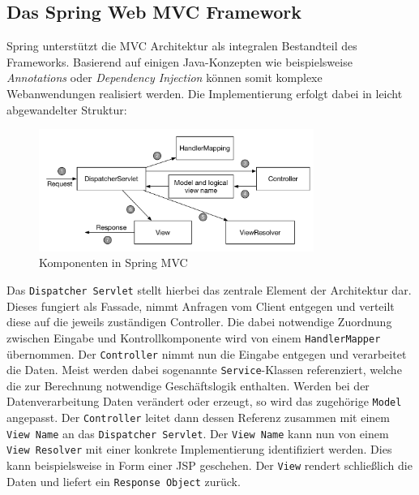 \subsection{Das Spring Web MVC Framework}
Spring unterstützt die \acs{MVC} Architektur als integralen Bestandteil des Frameworks. Basierend auf einigen Java-Konzepten wie beispielsweise \textit{Annotations} oder \textit{Dependency Injection} können somit komplexe Webanwendungen realisiert werden. Die Implementierung erfolgt dabei in leicht abgewandelter Struktur: \\
\begin{figure}[bth] 
  \centering
  \includegraphics[width=0.8\textwidth]{Graphics/spring_mvc}
  \caption{Komponenten in Spring MVC}
\end{figure}
\newpage
Das \texttt{Dispatcher Servlet} stellt hierbei das zentrale Element der Architektur dar. Dieses fungiert als Fassade, nimmt Anfragen vom Client entgegen und verteilt diese auf die jeweils zuständigen Controller. Die dabei notwendige Zuordnung zwischen Eingabe und Kontrollkomponente wird von einem \texttt{HandlerMapper} übernommen. Der \texttt{Controller} nimmt nun die Eingabe entgegen und verarbeitet die Daten. Meist werden dabei sogenannte \texttt{Service}-Klassen referenziert, welche die zur Berechnung notwendige Geschäftslogik enthalten. Werden bei der Datenverarbeitung Daten verändert oder erzeugt, so wird das zugehörige \texttt{Model} angepasst. Der \texttt{Controller} leitet dann dessen Referenz zusammen mit einem \texttt{View Name} an das \texttt{Dispatcher Servlet}. Der \texttt{View Name} kann nun von einem \texttt{View Resolver} mit einer konkrete Implementierung identifiziert werden. Dies kann beispielsweise in Form einer \acs{JSP} geschehen. Der \texttt{View} rendert schließlich die Daten und liefert ein \texttt{Response Object} zurück.